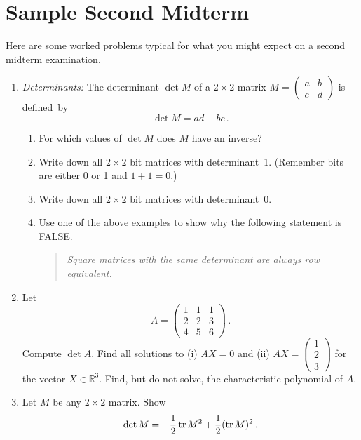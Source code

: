\chapter{Sample Second Midterm}

Here are some worked problems typical for what you might expect on a second midterm examination.
\label{sample2}

\begin{enumerate}

\item
{\itshape Determinants:} The determinant $\det M$ of a $2\times 2$ matrix $M=\begin{pmatrix}a&b\\c&d\end{pmatrix}$ is defined~by
\[
\det M =ad -bc\, .
\] 
\begin{enumerate}
\item For which values of $\det M$ does $M$ have an inverse?
\item Write down all $2\times 2$ bit matrices with determinant~1. (Remember bits are either 0 or 1 and $1+1=0$.)
\item Write down all $2\times 2$ bit matrices with determinant~0.
\item Use one of the above examples to show why the following statement is FALSE.
\begin{quote}
{\itshape Square matrices with the same determinant are always row equivalent.}
\end{quote}
\end{enumerate}



\item
Let 
\[
A=\left(\begin{array}{ccc}1&1&1\\[2mm]2&2&3\\[2mm]4&5&6\end{array}\right)\, .
\]
Compute $\det A$.
Find all solutions to (i) $A X =  0$ and (ii) $A X=\left(
\begin{array}{c}1\\2\\3\end{array}\right)$ for the vector $X\in \mathbb R^3$. Find, but do not solve,
the characteristic polynomial of $A$.

\item
Let $M$ be any $2\times 2$ matrix. Show
\[
\det M = -\frac 12 \operatorname{tr} M^2 + \frac 12 (\operatorname{tr} M)^2\, .
\]


\end{enumerate}
